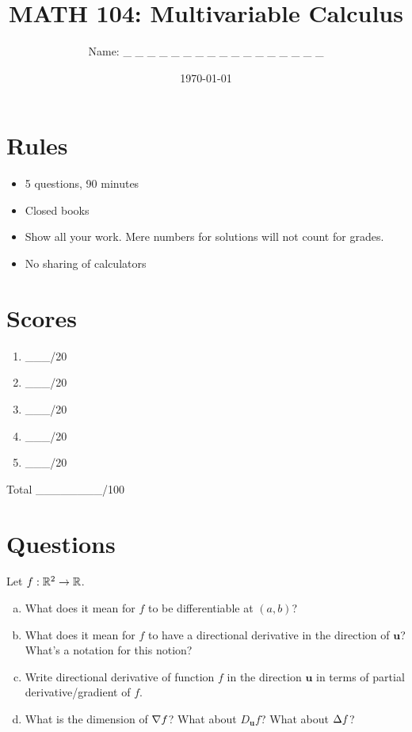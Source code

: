 \documentclass[12pt]{article}
\title{ MATH 104: Multivariable Calculus}
\author{Name: \_ \_ \_ \_ \_ \_ \_ \_ \_ \_ \_ \_ \_ \_ \_ \_ \_}
\date{\today}
\begin{document}
\maketitle

\section*{Rules}

\begin{itemize}
    \item 5 questions, 90 minutes
    \item Closed books
    \item Show all your work. Mere numbers for solutions will not count for grades.
    \item No sharing of calculators
\end{itemize}

\section*{Scores}

\begin{enumerate}[Problem 1.]
    \item  \_\_\_/20
    \item  \_\_\_/20
    \item \_\_\_/20
    \item  \_\_\_/20
    \item  \_\_\_/20
\end{enumerate}
Total \_\_\_\_\_\_\_\_/100


\newpage
\section*{Questions}

\begin{problem}Let $f:\mathbb{R}^2 \to \mathbb{R}$.
    \begin{enumerate}[a.]
        \item  What does it mean for $f$ to be 
            differentiable at $(a,b)$?
        \item What does it mean for $f$ to have a directional derivative
            in the direction of $\textbf{u}$? What's a notation for this notion?
        \item Write directional derivative of function $f$ in the direction $\textbf{u}$ in terms of partial derivative/gradient of $f$.
        \item What is the dimension of $\nabla f$? 
            What about $D_{\textbf{u}}f$? 
            What about $\Delta f$?
    \end{enumerate}
\end{problem}
\end{document}
